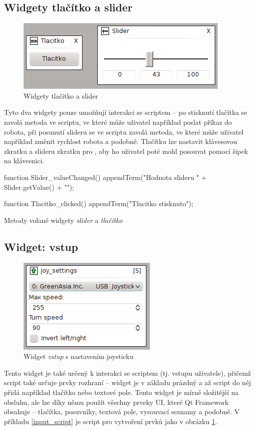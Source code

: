 \documentclass[12pt, a4paper, oneside]{article}
\newcommand{\It}{\textit}  %
\begin{document}
\subsection{Widgety tlačítko a slider}
\begin{figure}[H]
\begin{center}
\includegraphics[scale=1]{img/w_btn_slider.png}
\caption{Widgety tlačítko a slider}
\end{center}
\end{figure}
Tyto dva widgety pouze umožňují interakci se scriptem -- po stisknutí tlačítka se zavolá metoda ve scriptu, ve které může uživatel například poslat příkaz do robota, při posunutí slideru se ve scriptu zavolá metoda, ve které může uživatel například změnit rychlost robota a podobně. Tlačítku lze nastavit klávesovou zkratku a slideru zkratku pro , aby ho uživatel poté mohl posouvat pomocí šipek na klávesnici.
\begin{listing}[H]
\begin{jscode}
function Slider_valueChanged() {
    appendTerm("Hodnota slideru " + Slider.getValue() + "\n");
}

function Tlacitko_clicked() {
    appendTerm("Tlacitko stisknuto\n");
}
\end{jscode}
\caption{Metody volané widgety \It{slider} a \It{tlačítko}}
\end{listing}

\subsection{Widget: vstup}
\begin{figure}[H]
\begin{center}
\includegraphics[scale=1]{img/w_input.png}
\caption{Widget \It{vstup} s nastavením joysticku}
\label{input}
\end{center}
\end{figure}
Tento widget je také určený k interakci se scriptem (tj. vstupu uživatele), přičemž script také určuje prvky rozhraní -- widget je v základu prázdný a až script do něj přidá například tlačítko nebo textové pole. Tento widget je mírně složitější na obsluhu, ale lze díky němu použít všechny prveky UI, které Qt Framework obsahuje -- tlačítka, posuvníky, textová pole, vysouvací seznamy a podobně. V příkladu \ref{input_script} je script pro vytvoření prvků jako v obrázku \ref{input}.
\end{document}
